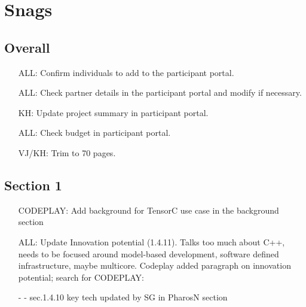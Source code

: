 \newpage
\section*{Snags}

\subsection*{Overall}

\begin{itemize}
\item[ALL:]
Confirm individuals to add to the participant portal.
\item[ALL:]
Check partner details in the participant portal and modify if necessary.
\item[KH:]
Update project summary in participant portal.
\item[ALL:]
Check budget in participant portal.
\item[VJ/KH:]
Trim to 70 pages.
\end{itemize}

\subsection*{Section 1}

\begin{itemize}
\item[CODEPLAY:]
Add background for TensorC use case in the background section
\item[ALL:]
Update Innovation potential (1.4.11).  Talks too much about C++, needs to be focused around model-based development, 
software defined infrastructure, maybe multicore.
Codeplay added paragraph on innovation potential; search for CODEPLAY:
\item[-] - sec.1.4.10 key tech updated by SG in PharosN section 
\end{itemize}


